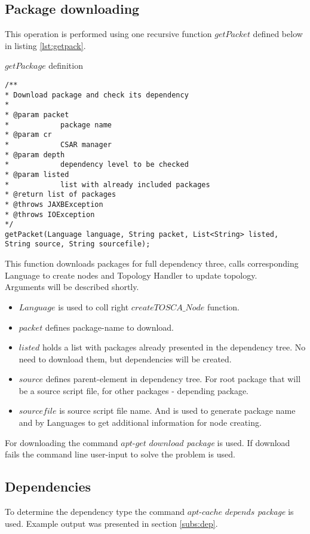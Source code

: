 \subsection*{Package downloading}
This operation is performed using one recursive function $getPacket$ defined below in listing \ref{lst:getpack}.
\begin{Listing}
\caption{$getPackage$ definition}
\label{lst:getpack}
\begin{lstlisting}
/**
* Download package and check its dependency
* 
* @param packet
*            package name
* @param cr
*            CSAR manager
* @param depth
*            dependency level to be checked
* @param listed
*            list with already included packages
* @return list of packages
* @throws JAXBException
* @throws IOException
*/
getPacket(Language language, String packet, List<String> listed, String source, String sourcefile);
\end{lstlisting}
\end{Listing}
This function downloads packages for full dependency three, calls corresponding Language to create nodes and Topology Handler to update topology.\\
Arguments will be described shortly.
\begin{itemize}
	\item $Language$ is used to coll right $createTOSCA\_Node$ function.
	\item $packet$ defines package-name to download.
	\item $listed$ holds a list with packages already presented in the dependency tree. No need to download them, but dependencies will be created.
	\item $source$ defines parent-element in dependency tree. For root package that will be a source script file, for other packages - depending package.
	\item $sourcefile$ is source script file name. And is used to generate package name and by Languages to get additional information for node creating. 
\end{itemize}
For downloading the command $apt$-$get$ $download$ \emph{package} is used. 
If download fails the command line user-input to solve the problem is used. 

\subsection*{Dependencies}
To determine the dependency type the command $apt$-$cache$ $depends$  \emph{package} is used.
Example output was presented in section \ref{subs:dep}.

